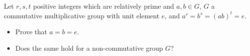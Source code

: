 Let \(r,s,t\) positive integers which are relatively prime and \(a,b \in G\), \(G\) a commutative multiplicative group with unit element \(e\), and \(a^r=b^s=(ab)^t=e\).\begin{itemize}

\item[(a)] Prove that \(a=b=e\).
\item[(b)] Does the same hold for a non-commutative group \(G\)?
\end{itemize}

